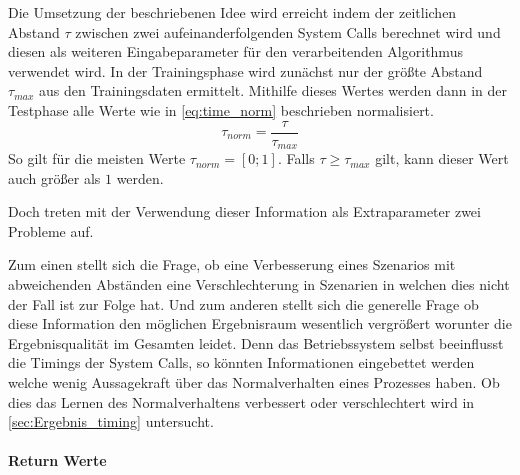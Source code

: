                 Die Umsetzung der beschriebenen Idee wird erreicht indem der zeitlichen Abstand $\tau$ zwischen zwei aufeinanderfolgenden System Calls berechnet wird und diesen als weiteren Eingabeparameter für den verarbeitenden Algorithmus verwendet wird.
                In der Trainingsphase wird zunächst nur der größte Abstand $\tau_{max}$ aus den Trainingsdaten ermittelt.
                Mithilfe dieses Wertes werden dann in der Testphase alle Werte wie in \autoref{eq:time_norm} beschrieben normalisiert.
                \begin{equation}\label{eq:time_norm}
                    \tau_{norm} = \frac{\tau}{\tau_{max}}
                \end{equation}
                So gilt für die meisten Werte $\tau_{norm}=[0;1]$.
                Falls $\tau\geq\tau_{max}$ gilt, kann dieser Wert auch größer als $1$ werden.

                Doch treten mit der Verwendung dieser Information als Extraparameter zwei Probleme auf.

                Zum einen stellt sich die Frage, ob eine Verbesserung eines Szenarios mit abweichenden Abständen eine Verschlechterung in Szenarien in welchen dies nicht der Fall ist zur Folge hat.
                Und zum anderen stellt sich die generelle Frage ob diese Information den möglichen Ergebnisraum wesentlich vergrößert worunter die Ergebnisqualität im Gesamten leidet.
                Denn das Betriebssystem selbst beeinflusst die Timings der System Calls, so könnten Informationen eingebettet werden welche wenig Aussagekraft über das Normalverhalten eines Prozesses haben.
                Ob dies das Lernen des Normalverhaltens verbessert oder verschlechtert wird in \autoref{sec:Ergebnis_timing} untersucht.

            \paragraph{Return Werte}

